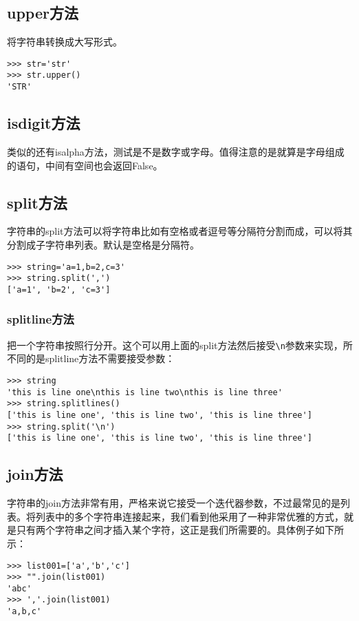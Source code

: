 \documentclass[12pt,oneside]{book}
\begin{document}
\begin{common-format}
\subsection{upper方法}
将字符串转换成大写形式。
\begin{Verbatim}
>>> str='str'
>>> str.upper()
'STR'
\end{Verbatim}


\subsection{isdigit方法}
类似的还有isalpha方法，测试是不是数字或字母。值得注意的是就算是字母组成的语句，中间有空间也会返回False。

\subsection{split方法}
字符串的split方法可以将字符串比如有空格或者逗号等分隔符分割而成，可以将其分割成子字符串列表。默认是空格是分隔符。
\begin{Verbatim}
>>> string='a=1,b=2,c=3'
>>> string.split(',')
['a=1', 'b=2', 'c=3']
\end{Verbatim}

\subsubsection{splitline方法}
把一个字符串按照行分开。这个可以用上面的split方法然后接受\verb+\n+参数来实现，所不同的是splitline方法不需要接受参数：
\begin{Verbatim}
>>> string
'this is line one\nthis is line two\nthis is line three'
>>> string.splitlines()
['this is line one', 'this is line two', 'this is line three']
>>> string.split('\n')
['this is line one', 'this is line two', 'this is line three']
\end{Verbatim}




\subsection{join方法}
字符串的join方法非常有用，严格来说它接受一个迭代器参数，不过最常见的是列表。将列表中的多个字符串连接起来，我们看到他采用了一种非常优雅的方式，就是只有两个字符串之间才插入某个字符，这正是我们所需要的。具体例子如下所示：
\begin{Verbatim}
>>> list001=['a','b','c']
>>> "".join(list001)
'abc'
>>> ','.join(list001)
'a,b,c'
\end{Verbatim}



\end{common-format}
\end{document}
